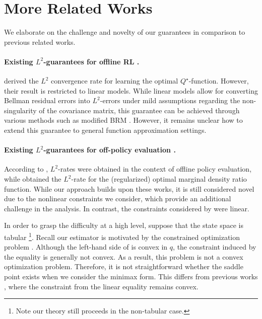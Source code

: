 
{ 



\section{More Related Works} \label{sec:related}





\label{sec:contribution_over}


We elaborate on the challenge and novelty of our guarantees in comparison to  previous related works.  


\paragraph{Existing $L^2$-guarantees for offline RL \citep{shi2022statistical}.}


\citet{shi2022statistical} derived the $L^2$ convergence rate for learning the optimal $Q^{\star}$-function. However, their result is restricted to linear models. While linear models allow for converting Bellman residual errors into $L^2$-errors under mild assumptions regarding the non-singularity of the covariance matrix, this guarantee can be achieved through various methods such as modified BRM \citep{antos2008learning}. However, it remains unclear how to extend this guarantee to general function approximation settings.


\paragraph{Existing $L^2$-guarantees for off-policy evaluation \citep{huang2022beyond,zhan2022offline}.}

According to \citet{huang2022beyond}, $L^2$-rates were obtained in the context of offline policy evaluation, while \citet{zhan2022offline} obtained the $L^2$-rate for the (regularized) optimal marginal density ratio function. While our approach builds upon these works, it is still considered novel due to the nonlinear constraints we consider, which provide an additional challenge in the analysis. In contrast, the constraints considered by \citet{huang2022beyond,zhan2022offline} were linear.

In order to grasp the difficulty at a high level, suppose that the state space is tabular \footnote{Note our theory still proceeds in the non-tabular case.}. Recall our estimator is motivated by the constrained optimization problem . Although the left-hand side of  is convex in $q$, the constraint induced by the equality is generally not convex. As a result, this problem is not a convex optimization problem. Therefore, it is not straightforward whether the saddle point exists when we consider the minimax form. This differs from previous works \citep{huang2022beyond,zhan2022offline}, where the constraint from the linear equality remains convex. 

}
